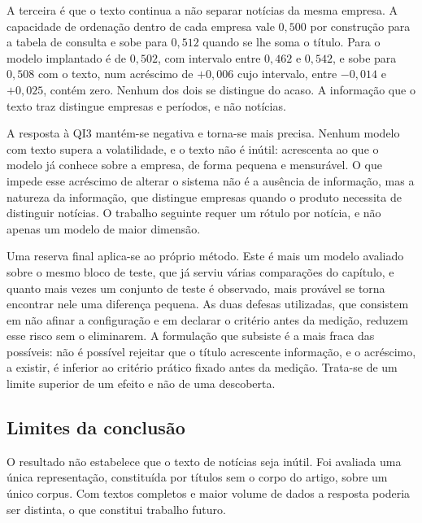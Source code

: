 A terceira é que o texto
continua a não separar notícias da mesma empresa. A capacidade de ordenação dentro de cada empresa
vale $0{,}500$ por construção para a tabela de consulta e sobe para $0{,}512$ quando se lhe soma o
título. Para o modelo implantado é de $0{,}502$, com intervalo entre $0{,}462$ e $0{,}542$, e sobe
para $0{,}508$ com o texto, num acréscimo de $+0{,}006$ cujo intervalo, entre $-0{,}014$ e
$+0{,}025$, contém zero. Nenhum dos dois se distingue do acaso. A informação que o texto traz distingue empresas e períodos, e não
notícias.

A resposta à \gls{QI}3 mantém-se negativa e torna-se mais precisa. Nenhum modelo com texto supera a
volatilidade, e o texto não é inútil: acrescenta ao que o modelo já conhece sobre a empresa, de forma
pequena e mensurável. O que impede esse acréscimo de alterar o sistema não é a ausência de
informação, mas a natureza da informação, que distingue empresas quando o produto necessita de
distinguir notícias. O trabalho seguinte requer um rótulo por notícia, e não apenas um modelo de
maior dimensão.

Uma reserva final aplica-se ao próprio método. Este é mais um modelo avaliado sobre o mesmo bloco de
teste, que já serviu várias comparações do capítulo, e quanto mais vezes um conjunto de teste é
observado, mais provável se torna encontrar nele uma diferença pequena. As duas defesas utilizadas,
que consistem em não afinar a configuração e em declarar o critério antes da medição, reduzem esse
risco sem o eliminarem. A formulação que subsiste é a mais fraca das possíveis: não é possível
rejeitar que o título acrescente informação, e o acréscimo, a existir, é inferior ao critério prático
fixado antes da medição. Trata-se de um limite superior de um efeito e não de uma descoberta.

\subsection{Limites da conclusão}

O resultado não estabelece que o texto de notícias seja inútil. Foi avaliada uma única representação,
constituída por títulos sem o corpo do artigo, sobre um único corpus. Com textos completos e maior
volume de dados a resposta poderia ser distinta, o que constitui trabalho futuro.

